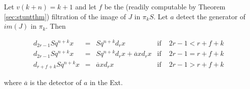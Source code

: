 \begin{Theorem}
  \label{sec:dsq2}
  Let $v(k+n)=k+1$ and let $f$ be the (readily computable by Theorem \ref{sec:stuntthm}) filtration of the image of $J$ in $\pi_{k}S$.  Let $a$ detect the generator of $im(J)$ in $\pi_k$.  Then

  \[  \begin{array}{llccr}
    d_{2r-1}Sq^{n+k}x &=& Sq^{n+k}d_rx & \mbox{if } & 2r-1 < r + f + k\\
    d_{2r-1}Sq^{n+k}x &=& Sq^{n+k}d_rx + \overline{a}xd_rx & \mbox{if } &2r-1 = r + f + k\\
    d_{r + f + k}Sq^{n+k}x &=& \overline{a}xd_rx & \mbox{if }& 2r-1 > r + f + k
  \end{array}\]
  
  where $\overline{a}$ is the detector of $a$ in the Ext.  

\end{Theorem}

